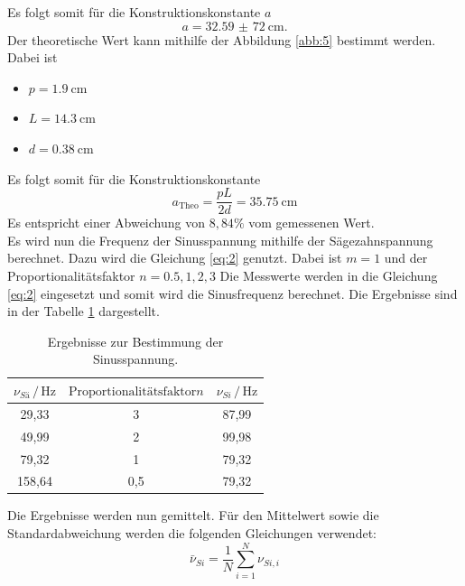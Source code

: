 Es folgt somit für die Konstruktionskonstante $a$
\begin{equation*}
  a = \SI{32,59(72)}{\centi\meter}.
\end{equation*}
Der theoretische Wert kann mithilfe der Abbildung \ref{abb:5} bestimmt werden.
Dabei ist
\begin{itemize}
  \item $p = \SI{1.9}{\centi\meter}$
  \item $L = \SI{14.3}{\centi\meter}$
  \item $d = \SI{0.38}{\centi\meter}$
\end{itemize}
Es folgt somit für die Konstruktionskonstante
\begin{equation*}
  a_{\text{Theo}} = \frac{pL}{2d} = \SI{35.75}{\centi\meter}
\end{equation*}
Es entspricht einer Abweichung von $8,84 \%$ vom gemessenen Wert.\\
\newline
Es wird nun die Frequenz der Sinusspannung mithilfe der Sägezahnspannung
berechnet.
Dazu wird die Gleichung \ref{eq:2} genutzt. Dabei ist $m = 1$ und der
Proportionalitätsfaktor $n= 0.5, 1, 2, 3$
Die Messwerte werden in die Gleichung \ref{eq:2} eingesetzt und somit wird die Sinusfrequenz berechnet.
Die Ergebnisse sind in der Tabelle \ref{tab:3} dargestellt.
\begin{table}[H]
  \centering
  \caption{Ergebnisse zur Bestimmung der Sinusspannung.}
  \label{tab:3}
  \begin{tabular}{c c c}
\toprule
$\nu_{Sä} \,/\, \si{\hertz}$& $\text{Proportionalitätsfaktor} n$ & $\nu_{Si} \, /\, \si{\hertz}$\\
\midrule
29,33 & 3 & 87,99\\
49,99 & 2 & 99,98\\
79,32 & 1 & 79,32\\
158,64& 0,5& 79,32\\
\bottomrule
  \end{tabular}
\end{table}
Die Ergebnisse werden nun gemittelt.
Für den Mittelwert sowie die Standardabweichung werden die folgenden Gleichungen verwendet:
\begin{equation*}
    \bar{\nu}_{Si}= \frac{1}{N} \sum_{i=1}^{N} \nu_{Si,i}
\end{equation*}

